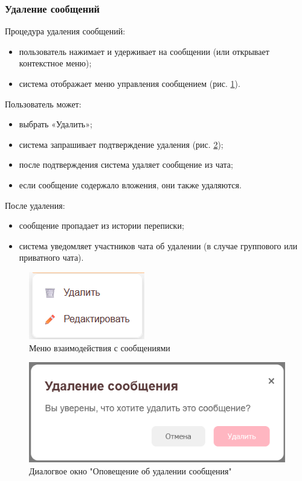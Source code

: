 \subsubsection{Удаление сообщений}  
Процедура удаления сообщений:
\begin{itemize}
	\item пользователь нажимает и удерживает на сообщении (или открывает контекстное меню);
	\item система отображает меню управления сообщением (рис. \ref{fig:message-menu}).
\end{itemize}

Пользователь может:
\begin{itemize}
	\item выбрать «Удалить»;
	\item система запрашивает подтверждение удаления (рис. \ref{fig:message-delete});
	\item после подтверждения система удаляет сообщение из чата;
	\item если сообщение содержало вложения, они также удаляются.
\end{itemize}

После удаления:
\begin{itemize}
	\item сообщение пропадает из истории переписки;
	\item система уведомляет участников чата об удалении (в случае группового или приватного чата).
\end{itemize}

\begin{figure}[H]
	\centering
	\includegraphics[width=0.7\linewidth]{"images/Меню взаимодействия с сообщениями"}
	\caption{Меню взаимодействия с сообщениями}
	\label{fig:message-menu}
\end{figure}

\begin{figure}[H]
	\centering
	\includegraphics[width=0.7\linewidth]{"images/Окно уточнения удаления"}
	\caption{Диалогвое окно "Оповещение об удалении сообщения"}
	\label{fig:message-delete}
\end{figure}

